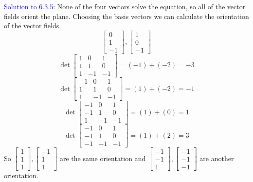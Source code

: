 \documentclass[12pt]{article}
\begin{document}
{\textcolor{blue}{Solution to 6.3.5:}
    None of the four vectors solve the equation, 
    so all of the vector fields orient the plane.
    Choosing the basis vectors we can calculate the orientation of the 
    vector fields.
    \[
        \begin{bmatrix}
            0 \\ 1 \\ -1
        \end{bmatrix},
        \begin{bmatrix}
            1 \\ 0 \\ -1
        \end{bmatrix}
    \]
    \[
        \det \begin{bmatrix}
            1 & 0 & 1 \\
            1 & 1 & 0 \\
            1 & -1 & -1
        \end{bmatrix} = (-1) + (-2) = -3
    \]
    \[
        \det \begin{bmatrix}
            -1 & 0 & 1 \\
            1 & 1 & 0 \\
            1 & -1 & -1
        \end{bmatrix} = (1) + (-2) = -1
    \]
    \[
        \det \begin{bmatrix}
            -1 & 0 & 1 \\
            -1 & 1 & 0 \\
            1 & -1 & -1
        \end{bmatrix} = (1) + (0) = 1
    \]
    \[
        \det \begin{bmatrix}
            -1 & 0 & 1 \\
            -1 & 1 & 0 \\
            -1 & -1 & -1
        \end{bmatrix} = (1) + (2) = 3
    \]
    So
    $
        \begin{bmatrix}
            1 \\ 1 \\ 1
        \end{bmatrix},
        \begin{bmatrix}
            -1 \\ 1 \\ 1
        \end{bmatrix}
    $
    are the same orientation and
    $
        \begin{bmatrix}
            -1 \\ -1 \\ 1
        \end{bmatrix},
        \begin{bmatrix}
            -1 \\ -1 \\ -1
        \end{bmatrix}
    $
    are another orientation.
\newpage

}
\end{document}
